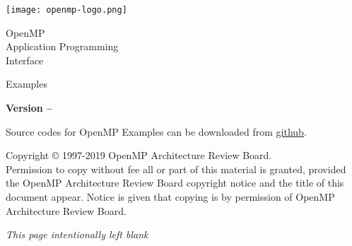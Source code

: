 
  \begin{titlepage}
    \begin{flushleft}
     \hspace{-6em} \texttt{[image: openmp-logo.png]}
    \end{flushleft}

    \begin{adjustwidth}{-0.75in}{0in}
    \begin{center}
      \Huge
      \textsf{OpenMP\\Application Programming\\Interface}

      \vspace{0.5in}\textsf{Examples}\vspace{-0.7in}
      \normalsize

      \vspace{1.0in}

      \textbf{Version \PVER{} -- \VERDATE}
    \end{center}
    \end{adjustwidth}

    \vspace{2.3in} %

Source codes for OpenMP \PVER{} Examples can be downloaded from
 \href{https://github.com/OpenMP/Examples/tree/v\VER}{github}.\\

\begin{adjustwidth}{0pt}{1em}\setlength{\parskip}{0.25\baselineskip}%
Copyright © 1997-2019 OpenMP Architecture Review Board.\\
Permission to copy without fee all or part of this material is granted,
provided the OpenMP Architecture Review Board copyright notice and
the title of this document appear. Notice is given that copying is by
permission of OpenMP Architecture Review Board.\end{adjustwidth}

  \end{titlepage}


\clearpage
\thispagestyle{empty}
\phantom{a}
\emph{This page intentionally left blank}

\vfill

